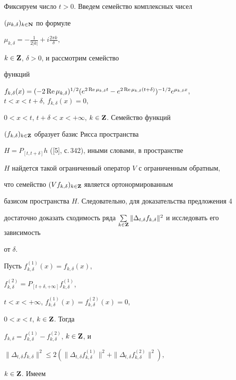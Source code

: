 \begin{pf}


Фиксируем число $t>0$. Введем семейство комплексных чисел


$(\mu_{k,\delta})_{k\in \bold N}$ по формуле


$\mu_{k,\delta}=-\frac {1}{2|k|}+i\frac {2\pi k}{\delta}$,


$k\in \bold Z$, $\delta >0$, и рассмотрим семейство


функций


$f_{k,\delta}(x)=(-2\re\mu_{k,\delta})^{1/2}


(e^{2\re\mu_{k,\delta}t}-e^{2\re\mu_{k,\delta}(t+\delta)})^{-1/2}


e^{\mu_{k,\delta}x}$, $t<x<t+\delta,\ f_{k,\delta}(x)=0$,


$0<x<t$, $t+\delta <x<+\infty$, $k\in \bold Z$. Семейство функций


$(f_{k,\delta})_{k\in \bold Z}$ образует базис Рисса пространства


$H=P_{[t,t+\delta ]}h$ ([5], с.\,342), иными словами, в пространстве


$H$ найдется такой ограниченный оператор $V$ с ограниченным обратным,


что семейство $(Vf_{k,\delta})_{k\in \bold Z}$ является ортонормированным


базисом пространства $H$. Следовательно, для доказательства предложения 4


достаточно доказать сходимость ряда $\sum \limits_{k\in \bold Z}


\|\Delta_{t,\delta}f_{k,\delta}\|^2$ и исследовать его зависимость


от $\delta$.


Пусть $f_{k,\delta}^{(1)}(x)=f_{k,\delta}(x)$,


$f_{k,\delta}^{(2)}=P_{[t+\delta,+\infty ]}f_{k,\delta}^{(1)}$,


$t<x<+\infty$, $f_{k,\delta}^{(1)}(x)=f_{k,\delta}^{(2)}(x)=0$,


$0<x<t$, $k\in \bold Z$. Тогда


$f_{k,\delta}=f_{k,\delta}^{(1)}-f_{k,\delta}^{(2)}$, $k\in \bold Z$, и


$\|\Delta_{t,\delta}f_{k,\delta}\|^2\leq 2(\|\Delta_{t,\delta}


f_{k,\delta}^{(1)}\|^2+\|\Delta_{t,\delta}f_{k,\delta}^{(2)}\|^2)$,


$k\in \bold Z$. Имеем


\begin{gather*}



\end{gather*}
\end{pf}
